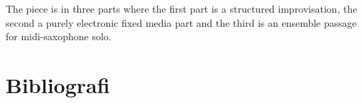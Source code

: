 \documentclass[a4paper]{article}
\begin{document}
The piece is in three parts where the first part is a structured improvisation, the second a purely electronic fixed media part and the third is an ensemble passage for midi-saxophone solo. 


\clearpage


\section{Bibliografi}


\end{document}
